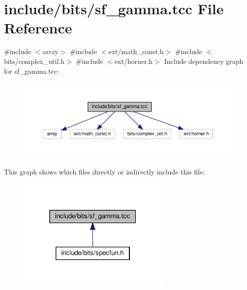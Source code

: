 \hypertarget{sf__gamma_8tcc}{}\section{include/bits/sf\+\_\+gamma.tcc File Reference}
\label{sf__gamma_8tcc}
{\ttfamily \#include $<$array$>$}\newline
{\ttfamily \#include $<$ext/math\+\_\+const.\+h$>$}\newline
{\ttfamily \#include $<$bits/complex\+\_\+util.\+h$>$}\newline
{\ttfamily \#include $<$ext/horner.\+h$>$}\newline
Include dependency graph for sf\+\_\+gamma.\+tcc\+:
\nopagebreak
\begin{figure}[H]
\begin{center}
\leavevmode
\includegraphics[width=350pt]{sf__gamma_8tcc__incl}
\end{center}
\end{figure}
This graph shows which files directly or indirectly include this file\+:
\nopagebreak
\begin{figure}[H]
\begin{center}
\leavevmode
\includegraphics[width=211pt]{sf__gamma_8tcc__dep__incl}
\end{center}
\end{figure}
